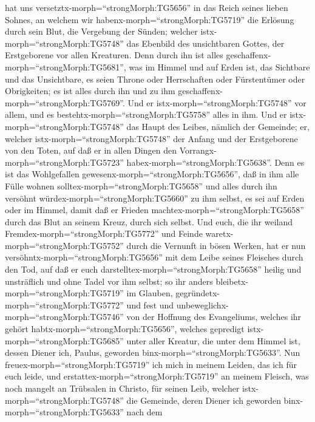 hat uns versetztx-morph=``strongMorph:TG5656'' in das Reich seines
lieben Sohnes,  an welchem wir
habenx-morph=``strongMorph:TG5719'' die Erlösung durch sein Blut, die
Vergebung der Sünden;  welcher
istx-morph=``strongMorph:TG5748'' das Ebenbild des unsichtbaren Gottes,
der Erstgeborene vor allen Kreaturen.  Denn durch ihn ist
alles geschaffenx-morph=``strongMorph:TG5681'', was im Himmel und auf
Erden ist, das Sichtbare und das Unsichtbare, es seien Throne oder
Herrschaften oder Fürstentümer oder Obrigkeiten; es ist alles durch ihn
und zu ihm geschaffenx-morph=``strongMorph:TG5769''.  Und
er istx-morph=``strongMorph:TG5748'' vor allem, und es
bestehtx-morph=``strongMorph:TG5758'' alles in ihm.  Und er
istx-morph=``strongMorph:TG5748'' das Haupt des Leibes, nämlich der
Gemeinde; er, welcher istx-morph=``strongMorph:TG5748'' der Anfang und
der Erstgeborene von den Toten, auf daß er in allen Dingen den
Vorrangx-morph=``strongMorph:TG5723''
habex-morph=``strongMorph:TG5638''.  Denn es ist das
Wohlgefallen gewesenx-morph=``strongMorph:TG5656'', daß in ihm alle
Fülle wohnen solltex-morph=``strongMorph:TG5658''  und
alles durch ihn versöhnt würdex-morph=``strongMorph:TG5660'' zu ihm
selbst, es sei auf Erden oder im Himmel, damit daß er Frieden
machtex-morph=``strongMorph:TG5658'' durch das Blut an seinem Kreuz,
durch sich selbst.  Und euch, die ihr weiland
Fremdex-morph=``strongMorph:TG5772'' und Feinde
waretx-morph=``strongMorph:TG5752'' durch die Vernunft in bösen Werken,
 hat er nun versöhntx-morph=``strongMorph:TG5656'' mit dem
Leibe seines Fleisches durch den Tod, auf daß er euch
darstelltex-morph=``strongMorph:TG5658'' heilig und unsträflich und ohne
Tadel vor ihm selbst;  so ihr anders
bleibetx-morph=``strongMorph:TG5719'' im Glauben,
gegründetx-morph=``strongMorph:TG5772'' und fest und
unbeweglichx-morph=``strongMorph:TG5746'' von der Hoffnung des
Evangeliums, welches ihr gehört habtx-morph=``strongMorph:TG5656'',
welches gepredigt istx-morph=``strongMorph:TG5685'' unter aller Kreatur,
die unter dem Himmel ist, dessen Diener ich, Paulus, geworden
binx-morph=``strongMorph:TG5633''.  Nun
freuex-morph=``strongMorph:TG5719'' ich mich in meinem Leiden, das ich
für euch leide, und erstattex-morph=``strongMorph:TG5719'' an meinem
Fleisch, was noch mangelt an Trübsalen in Christo, für seinen Leib,
welcher istx-morph=``strongMorph:TG5748'' die Gemeinde, 
deren Diener ich geworden binx-morph=``strongMorph:TG5633'' nach dem
